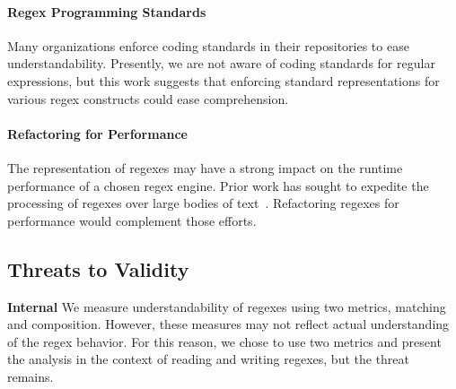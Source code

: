 %

\paragraph{Regex Programming Standards}
Many organizations enforce coding standards in their repositories to ease understandability.
Presently, we are not aware of coding standards for regular expressions, but this work suggests that enforcing standard representations for various regex constructs could ease comprehension.  

\paragraph{Refactoring for Performance}
The representation of regexes may have a strong impact on the runtime performance of a chosen regex engine. Prior work has sought to expedite the processing of regexes over large bodies of text~\cite{Baeza-Yates:1996:FTS:235809.235810}. 
Refactoring regexes for performance would complement those efforts. 

\subsection{Threats to Validity}

\textbf{Internal}
We measure understandability of regexes using two metrics, matching and composition. However, these measures may not reflect actual understanding of the regex behavior. For this reason, we chose to use two metrics and present the analysis in the context of reading and writing regexes, but the threat remains.

